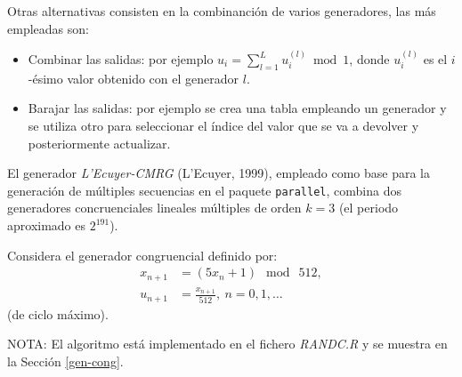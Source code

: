 \documentclass[
]{book}
\theoremstyle{break}
\theoremstyle{definition}
\theoremstyle{definition}
\theoremstyle{definition}
\theoremstyle{remark}
\let\BeginKnitrBlock\begin \let\EndKnitrBlock\end
\begin{document}
Otras alternativas consisten en la combinanción de varios generadores, las más empleadas son:

\begin{itemize}
\item
  Combinar las salidas: por ejemplo \(u_{i}=\sum_{l=1}^L u_{i}^{(l)} \bmod 1\), donde \(u_{i}^{(l)}\) es el \(i\)-ésimo valor obtenido con el generador \(l\).
\item
  Barajar las salidas: por ejemplo se crea una tabla empleando un generador y se utiliza otro para seleccionar el índice del valor que se va a devolver y posteriormente actualizar.
\end{itemize}

El generador \emph{L'Ecuyer-CMRG} (L'Ecuyer, 1999), empleado como base para la generación de múltiples secuencias en el paquete \texttt{parallel}, combina dos generadores concruenciales lineales múltiples de orden \(k=3\) (el periodo aproximado es \(2^{191}\)).

\BeginKnitrBlock{exercise}
\protect\hypertarget{exr:unnamed-chunk-6}{}{\label{exr:unnamed-chunk-6} }
\EndKnitrBlock{exercise}

Considera el generador congruencial definido por:
\[\begin{aligned}
x_{n+1}  & =(5x_{n}+1)\ \bmod\ 512,\nonumber\\
u_{n+1}  & =\frac{x_{n+1}}{512},\ n=0,1,\dots\nonumber
\end{aligned}\]
(de ciclo máximo).

NOTA: El algoritmo está implementado en el fichero \emph{RANDC.R} y se muestra en la Sección \ref{gen-cong}.
\end{document}

